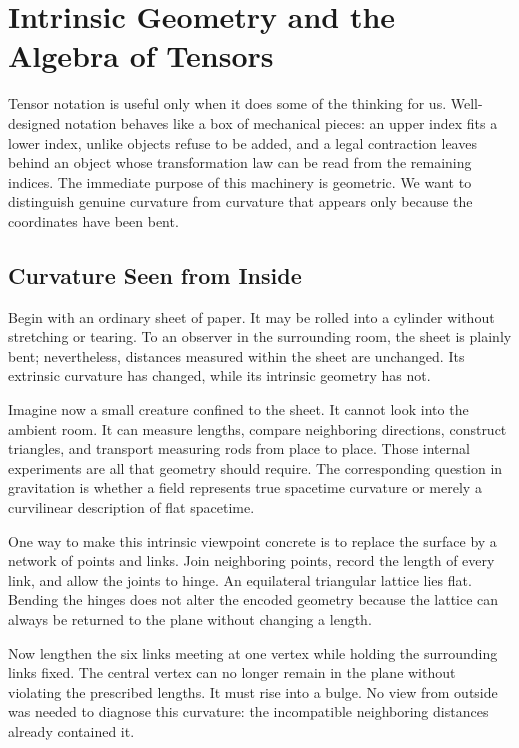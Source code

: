 \chapter{Intrinsic Geometry and the Algebra of Tensors}

Tensor notation is useful only when it does some of the thinking for us.
Well-designed notation behaves like a box of mechanical pieces: an upper
index fits a lower index, unlike objects refuse to be added, and a legal
contraction leaves behind an object whose transformation law can be read
from the remaining indices. The immediate purpose of this machinery is
geometric. We want to distinguish genuine curvature from curvature that
appears only because the coordinates have been bent.

\section{Curvature Seen from Inside}

Begin with an ordinary sheet of paper. It may be rolled into a cylinder
without stretching or tearing. To an observer in the surrounding room,
the sheet is plainly bent; nevertheless, distances measured within the
sheet are unchanged. Its extrinsic curvature has changed, while its
intrinsic geometry has not.

Imagine now a small creature confined to the sheet. It cannot look into
the ambient room. It can measure lengths, compare neighboring directions,
construct triangles, and transport measuring rods from place to place.
Those internal experiments are all that geometry should require. The
corresponding question in gravitation is whether a field represents true
spacetime curvature or merely a curvilinear description of flat
spacetime.

One way to make this intrinsic viewpoint concrete is to replace the
surface by a network of points and links. Join neighboring points,
record the length of every link, and allow the joints to hinge. An
equilateral triangular lattice lies flat. Bending the hinges does not
alter the encoded geometry because the lattice can always be returned
to the plane without changing a length.

Now lengthen the six links meeting at one vertex while holding the
surrounding links fixed. The central vertex can no longer remain in the
plane without violating the prescribed lengths. It must rise into a
bulge. No view from outside was needed to diagnose this curvature: the
incompatible neighboring distances already contained it.

